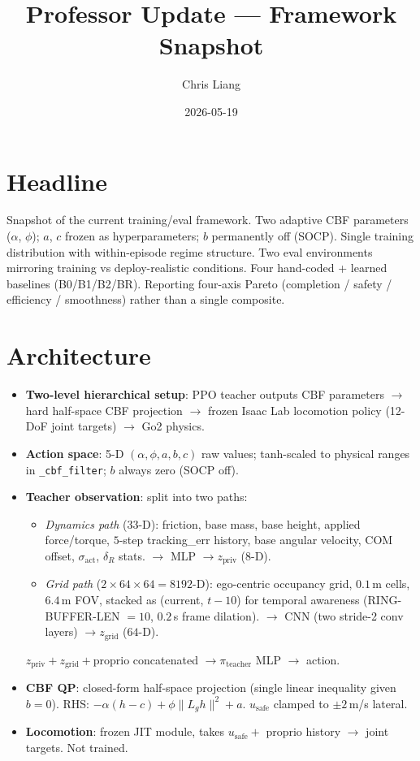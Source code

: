 \documentclass[11pt]{article}
\title{Professor Update — Framework Snapshot}
\author{Chris Liang}
\date{2026-05-19}
\begin{document}
\maketitle

\section*{Headline}

Snapshot of the current training/eval framework. Two adaptive CBF parameters ($\alpha$, $\phi$); $a$, $c$ frozen as hyperparameters; $b$ permanently off (SOCP). Single training distribution with within-episode regime structure. Two eval environments mirroring training vs deploy-realistic conditions. Four hand-coded + learned baselines (B0/B1/B2/BR). Reporting four-axis Pareto (completion / safety / efficiency / smoothness) rather than a single composite.

\section*{Architecture}

\begin{itemize}
\item \textbf{Two-level hierarchical setup}: PPO teacher outputs CBF parameters $\to$ hard half-space CBF projection $\to$ frozen Isaac Lab locomotion policy (12-DoF joint targets) $\to$ Go2 physics.
\item \textbf{Action space}: 5-D $(\alpha, \phi, a, b, c)$ raw values; tanh-scaled to physical ranges in \texttt{\_cbf\_filter}; $b$ always zero (SOCP off).
\item \textbf{Teacher observation}: split into two paths:
  \begin{itemize}
  \item \emph{Dynamics path} ($33$-D): friction, base mass, base height, applied force/torque, $5$-step tracking\_err history, base angular velocity, COM offset, $\sigma_\text{act}$, $\delta_R$ stats. $\to$ MLP $\to z_\text{priv}$ ($8$-D).
  \item \emph{Grid path} ($2 \times 64 \times 64 = 8192$-D): ego-centric occupancy grid, $0.1$\,m cells, $6.4$\,m FOV, stacked as (current, $t{-}10$) for temporal awareness (RING-BUFFER-LEN $=10$, $0.2$\,s frame dilation). $\to$ CNN (two stride-2 conv layers) $\to z_\text{grid}$ ($64$-D).
  \end{itemize}
  $z_\text{priv} + z_\text{grid} + \text{proprio}$ concatenated $\to \pi_\text{teacher}$ MLP $\to$ action.
\item \textbf{CBF QP}: closed-form half-space projection (single linear inequality given $b{=}0$). RHS: $-\alpha(h - c) + \phi \|L_g h\|^2 + a$. $u_\text{safe}$ clamped to $\pm 2$\,m/s lateral.
\item \textbf{Locomotion}: frozen JIT module, takes $u_\text{safe} +$ proprio history $\to$ joint targets. Not trained.
\end{itemize}
\end{document}
